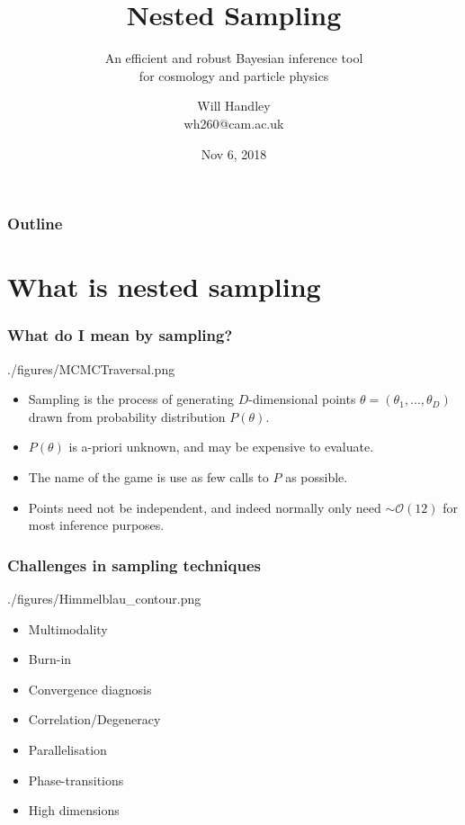 \documentclass[%
    handout
]{beamer}
\title{Nested Sampling}
\subtitle{An efficient and robust Bayesian inference tool\\ for cosmology and particle physics }
\author[Handley] %
{Will Handley\\ \small{wh260@cam.ac.uk}}
\institute[University of Cambridge] %
{%
Astrophysics Group \\
Cavendish Laboratory \\
University of Cambridge
}
\date{Nov 6, 2018}
\begin{document}
\begin{frame}
    \titlepage{}
\end{frame}

\begin{frame}
    \frametitle{Outline}
    \tableofcontents
\end{frame}

\section{What is nested sampling}
\begin{frame}
    \frametitle{What do I mean by sampling?}
\begin{figright}[0.6]{./figures/MCMCTraversal.png}
    \begin{itemize}
        \item Sampling is the process of generating $D$-dimensional points $\theta=(\theta_1,\ldots,\theta_D)$ drawn from probability distribution $P(\theta)$.
        \item $P(\theta)$ is a-priori unknown, and may be expensive to evaluate.
        \item The name of the game is use as few calls to $P$ as possible.
        \item Points need not be independent, and indeed normally only need $\sim\mathcal{O}(12)$ for most inference purposes.
    \end{itemize}
\end{figright}

\end{frame}

\begin{frame}
    \frametitle{Challenges in sampling techniques}
\begin{figright}[0.4]{./figures/Himmelblau_contour.png}
    \begin{itemize}
        \item Multimodality
        \item Burn-in
        \item Convergence diagnosis
        \item Correlation/Degeneracy 
        \item Parallelisation
        \item Phase-transitions
        \item High dimensions
    \end{itemize}
\end{figright}

\end{frame}
\end{document}
